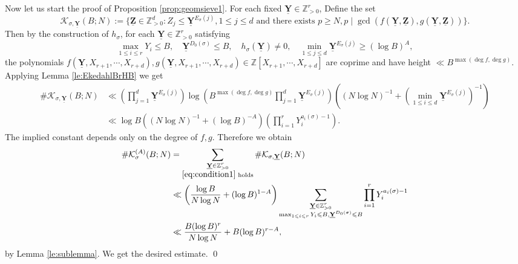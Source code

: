 \documentclass[11pt,letterpaper]{amsart}
\newcommand{\BZ}{{\mathbb {Z}}}
\newcommand{\CK}{{\mathcal {K}}}
\newcommand{\YY}{\underline{\mathbf{Y}}}
\newcommand{\ZZ}{\underline{\mathbf{Z}}}
\theoremstyle{plain}
\numberwithin{equation}{section}
\theoremstyle{definition}
\theoremstyle{remark}
\begin{document}
Now let us start the proof of Proposition \ref{prop:geomsieve1}.
For each fixed $\YY\in\BZ_{>0}^r$, Define the set
$$\CK_{\sigma,\YY}(B;N):=\{\ZZ\in\BZ_{>0}^d:Z_j\leqslant \YY^{E_\sigma(j)},1\leqslant j\leqslant d \text{ and there exists } p\geqslant N,p\mid\gcd( f(\YY,\ZZ),g(\YY,\ZZ))\}.$$
Then by the construction of $h_\sigma$,  for each $\YY\in\BZ_{>0}^r$ satisfying 
\begin{equation}\label{eq:condition1}
	\max_{1\leqslant i\leqslant r}Y_i\leqslant B,\quad  \YY^{D_0(\sigma)}\leqslant B, \quad h_\sigma(\YY)\neq 0,\quad  \min_{1\leqslant j\leqslant d}\YY^{E_\sigma(j)}\geqslant (\log B)^A,
\end{equation}  the polynomials  $f(\YY,X_{r+1},\cdots,X_{r+d}),g(\YY,X_{r+1},\cdots,X_{r+d})\in\BZ[X_{r+1},\cdots,X_{r+d}]$ are coprime and have height $\ll B^{\max(\deg f,\deg g)}$.
Applying Lemma \ref{le:EkedahlBrHB} we get
\begin{align*}
	\#\CK_{\sigma,\YY}(B;N)&\ll \left(\prod_{j=1}^{d}\YY^{E_\sigma(j)}\right)\log \left(B^{\max(\deg f,\deg g)}\prod_{j=1}^{d}\YY^{E_\sigma(j)}\right)\left((N \log N)^{-1}+\left(\min_{1\leqslant i\leqslant d}\YY^{E_\sigma(j)}\right)^{-1}\right) \\ &\ll \log B\left((N \log N)^{-1}+(\log B)^{-A}\right)\left(\prod_{i=1}^{r}Y_i^{a_i(\sigma)-1}\right).
\end{align*} 
The implied constant depends only on the degree of $f,g$.
Therefore we obtain
\begin{align*}
	\#\CK_{\sigma}^{(A)}(B;N)&=\sum_{\substack{\YY\in\BZ_{>0}^r\\\eqref{eq:condition1}\text{ holds}}}\#\CK_{\sigma,\YY}(B;N)\\ 	&\ll \left(\frac{\log B}{N \log N}+(\log B)^{1-A}\right)\sum_{\substack{\YY\in\BZ_{>0}^r\\\max_{1\leqslant i\leqslant r}Y_i\leqslant B, \YY^{D_0(\sigma)}\leqslant B }}\prod_{i=1}^{r}Y_i^{a_i(\sigma)-1}\\ &\ll\frac{B(\log B)^r}{N\log N}+B(\log B)^{r-A},
\end{align*} by Lemma \ref{le:sublemma}.
We get the desired estimate.
\qed
\end{document}
